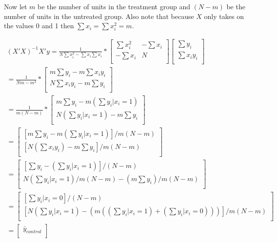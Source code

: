 \documentclass[12pt,letterpaper]{article}
\begin{document}
{Now let $m$ be the number of units in the treatment group and $(N-m)$ be the number of units in the untreated group. Also note that because $X$ only takes on the values 0 and 1 then $\sum x_i = \sum x_i^2 = m$.

\begin{eqnarray*}
(X'X)^{-1}X'y= \frac{1}{N \sum x_i^2 - \sum x_i \sum x_i} *
\begin{bmatrix} 
 \sum x_i^2& -\sum x_i \\
-\sum x_i & N\\
\end{bmatrix}
\begin{bmatrix} 
 \sum y_i \\
\sum x_i y_i \\
\end{bmatrix}\\
= \frac{1}{Nm - m^2} *
\begin{bmatrix} 
 m \sum y_i - m \sum x_i y_i \\
  N \sum x_iy_i - m  \sum y_i \\
 \end{bmatrix}\\
 = \frac{1}{m (N-m)} *
\begin{bmatrix} 
 m \sum y_i - m (\sum y_i|x_i=1) \\
  N (\sum y_i|x_i=1) - m  \sum y_i \\
 \end{bmatrix}\\
 =
\begin{bmatrix} 
 [m \sum y_i - m (\sum y_i|x_i=1)]/m (N-m)  \\
  [N (\sum x_iy_i) - m  \sum y_i]/m (N-m) \\
 \end{bmatrix}\\
 =
 \begin{bmatrix} 
 [ \sum y_i -  (\sum y_i|x_i=1)]/ (N-m)  \\
  N (\sum y_i|x_i=1)/m(N-m) - (m \sum y_i)/m (N-m) \\
 \end{bmatrix}\\
  =
 \begin{bmatrix} 
 [ \sum y_i|x_i=0]/ (N-m)  \\
  [N (\sum y_i|x_i=1) - (m ((\sum y_i|x_i=1) +(\sum y_i|x_i=0))  )]/m (N-m) \\
 \end{bmatrix}\\
   =
 \begin{bmatrix} 
\bar{y}_{control} \\

\end{bmatrix}
\end{eqnarray*}}
\end{document}
